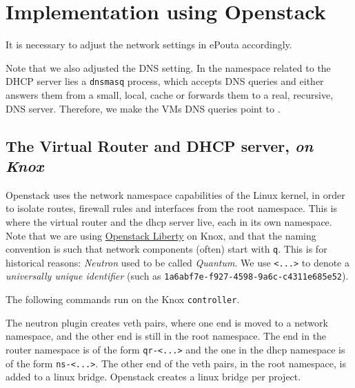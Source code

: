 \section{Implementation using Openstack}
\label{section:implementation}

\cutafter

It is necessary to adjust the network settings in ePouta accordingly.


Note that we also adjusted the DNS setting. In the namespace related
to the DHCP server lies a \texttt{dnsmasq} process, which accepts DNS
queries and either answers them from a small, local, cache or forwards
them to a real, recursive, DNS server. Therefore, we make the VMs DNS
queries point to .

\subsection{The Virtual Router and DHCP server, \emph{on  Knox}}
\label{section:virtual:router}
\label{section:dhcp:server:knox}

Openstack uses the network namespace capabilities of the Linux kernel,
in order to isolate routes, firewall rules and interfaces from the
root namespace. This is where the virtual router and the dhcp server
live, each in its own namespace. Note that we are using
\href{http://docs.openstack.org/liberty/install-guide-ubuntu/}{Openstack
  Liberty} on Knox, and that the naming convention is such that
network components (often) start with \texttt{q}. This is for
historical reasons: \emph{Neutron} used to be called
\emph{Quantum}. We use \texttt{\textless{}...\textgreater{}} to denote
a \emph{universally unique identifier} (such as
\texttt{1a6abf7e-f927-4598-9a6c-c4311e685e52}).

The following commands run on the Knox \texttt{controller}.


The neutron plugin creates veth pairs, where one end is moved to a
network namespace, and the other end is still in the root namespace.
The end in the router namespace is of the form
\texttt{qr-\textless{}...\textgreater{}} and the one in the dhcp
namespace is of the form \texttt{ns-\textless{}...\textgreater{}}. The
other end of the veth pairs, in the root namespace, is added to a
linux bridge. Openstack creates a linux bridge per project.

